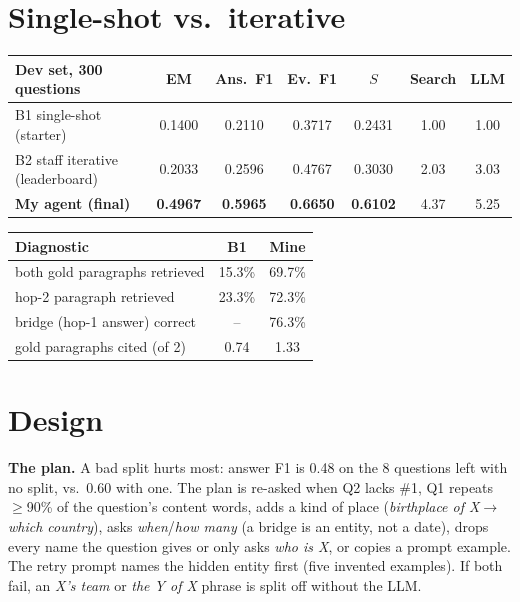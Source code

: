\documentclass[10pt,a4paper]{article}
\begin{document}
\section{Single-shot vs.\ iterative}
\begin{minipage}[t]{0.585\textwidth}
\vspace{0pt}
\centering\footnotesize
\begin{tabular}{@{}lcccccc@{}}
\toprule
Dev set, 300 questions & EM & Ans.\ F1 & Ev.\ F1 & $S$ & Search & LLM\\
\midrule
B1 single-shot (starter) & 0.1400 & 0.2110 & 0.3717 & 0.2431 & 1.00 & 1.00\\
B2 staff iterative (leaderboard) & 0.2033 & 0.2596 & 0.4767 & 0.3030 & 2.03 & 3.03\\
\textbf{My agent (final)} & \textbf{0.4967} & \textbf{0.5965} & \textbf{0.6650} & \textbf{0.6102} & 4.37 & 5.25\\
\bottomrule
\end{tabular}
\label{tab:main}
\end{minipage}\hfill
\begin{minipage}[t]{0.395\textwidth}
\vspace{0pt}
\centering\footnotesize
\begin{tabular}{@{}lcc@{}}
\toprule
Diagnostic & B1 & Mine\\
\midrule
both gold paragraphs retrieved & 15.3\% & 69.7\%\\
hop-2 paragraph retrieved & 23.3\% & 72.3\%\\
bridge (hop-1 answer) correct & -- & 76.3\%\\
gold paragraphs cited (of 2) & 0.74 & 1.33\\
\bottomrule
\end{tabular}
\end{minipage}


\section{Design}
\textbf{The plan.} A bad split hurts most: answer F1 is 0.48 on the 8 questions left with no split, vs.\
0.60 with one. The plan is re-asked when Q2 lacks \#1, Q1 repeats $\ge$90\% of the question's content words, adds
a kind of place (\emph{birthplace of X}$\to$\emph{which country}), asks \emph{when}/\emph{how many} (a bridge is an
entity, not a date), drops every name the question gives or only asks \emph{who is X}, or copies a prompt example.
The retry prompt names the hidden entity first (five invented examples). If both fail, an
\emph{X's team} or \emph{the Y of X} phrase is split off without the LLM.
\end{document}
